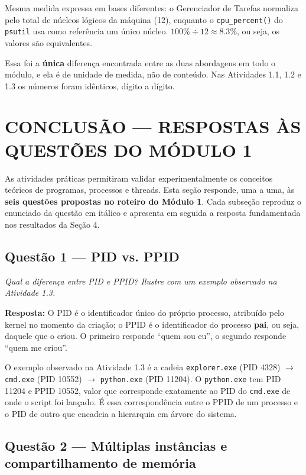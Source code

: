 \documentclass[12pt,a4paper]{article}
\begin{document}
\noindent * Mesma medida expressa em bases diferentes: o Gerenciador de Tarefas normaliza pelo total de núcleos lógicos da máquina (12), enquanto o \texttt{cpu\_percent()} do \texttt{psutil} usa como referência um único núcleo. $100\% \div 12 \approx 8.3\%$, ou seja, os valores são equivalentes.

Essa foi a \textbf{única} diferença encontrada entre as duas abordagens em todo o módulo, e ela é de unidade de medida, não de conteúdo. Nas Atividades 1.1, 1.2 e 1.3 os números foram idênticos, dígito a dígito.

\section{CONCLUSÃO — RESPOSTAS ÀS QUESTÕES DO MÓDULO 1}

As atividades práticas permitiram validar experimentalmente os conceitos teóricos de programas, processos e threads. Esta seção responde, uma a uma, às \textbf{seis questões propostas no roteiro do Módulo 1}. Cada subseção reproduz o enunciado da questão em itálico e apresenta em seguida a resposta fundamentada nos resultados da Seção 4.

\subsection{Questão 1 — PID vs. PPID}

\textit{Qual a diferença entre PID e PPID? Ilustre com um exemplo observado na Atividade 1.3.}

\textbf{Resposta:} O PID é o identificador único do próprio processo, atribuído pelo kernel no momento da criação; o PPID é o identificador do processo \textbf{pai}, ou seja, daquele que o criou. O primeiro responde ``quem sou eu'', o segundo responde ``quem me criou''.

O exemplo observado na Atividade 1.3 é a cadeia \texttt{explorer.exe} (PID 4328) $\rightarrow$ \texttt{cmd.exe} (PID 10552) $\rightarrow$ \texttt{python.exe} (PID 11204). O \texttt{python.exe} tem PID 11204 e PPID 10552, valor que corresponde exatamente ao PID do \texttt{cmd.exe} de onde o script foi lançado. É essa correspondência entre o PPID de um processo e o PID de outro que encadeia a hierarquia em árvore do sistema.

\subsection{Questão 2 — Múltiplas instâncias e compartilhamento de memória}
\end{document}
